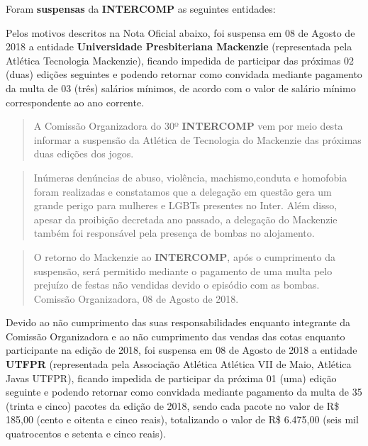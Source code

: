 
\begin{article}
	\label{art:suspensas}
	Foram \textbf{suspensas} da \textbf{INTERCOMP} as seguintes entidades:
	\begin{xparagraph}
    	Pelos motivos descritos na Nota Oficial abaixo, foi suspensa em 08 de Agosto de 2018 a entidade \textbf{Universidade Presbiteriana Mackenzie} (representada pela Atlética Tecnologia Mackenzie), ficando impedida de participar das próximas 02 (duas) edições seguintes e podendo retornar como convidada mediante pagamento da multa de 03 (três) salários mínimos, de acordo com o valor de salário mínimo correspondente ao ano corrente.
        \begin{quote}
            A Comissão Organizadora do 30º \textbf{INTERCOMP} vem por meio desta informar a suspensão da Atlética de Tecnologia do Mackenzie das próximas duas edições dos jogos.
        \end{quote}
        \begin{quote}
            Inúmeras denúncias de abuso, violência, machismo,conduta e homofobia foram realizadas e constatamos que a delegação em questão gera um grande perigo para mulheres e LGBTs presentes no Inter.
            Além disso, apesar da proibição decretada ano passado, a delegação do Mackenzie também foi responsável pela presença de bombas no alojamento.
        \end{quote}
        \begin{quote}
            O retorno do Mackenzie ao \textbf{INTERCOMP}, após o cumprimento da suspensão, será permitido mediante o pagamento de uma multa pelo prejuízo de festas não vendidas devido o episódio com as bombas.
            Comissão Organizadora, 
            08 de Agosto de 2018.
        \end{quote}
    \end{xparagraph}
    
	\begin{xparagraph}
    	Devido ao não cumprimento das suas responsabilidades enquanto integrante da Comissão Organizadora e ao não cumprimento das vendas das cotas enquanto participante na edição de 2018, foi suspensa em 08 de Agosto de 2018 a entidade \textbf{UTFPR} (representada pela Associação Atlética Atlética VII de Maio, Atlética Javas UTFPR), ficando impedida de participar da próxima 01 (uma) edição seguinte e podendo retornar como convidada mediante pagamento da multa de 35 (trinta e cinco) pacotes da edição de 2018, sendo cada pacote no valor de R\$ 185,00 (cento e oitenta e cinco reais), totalizando o valor de R\$ 6.475,00 (seis mil quatrocentos e setenta e cinco reais).
    \end{xparagraph}
    

\end{article}
